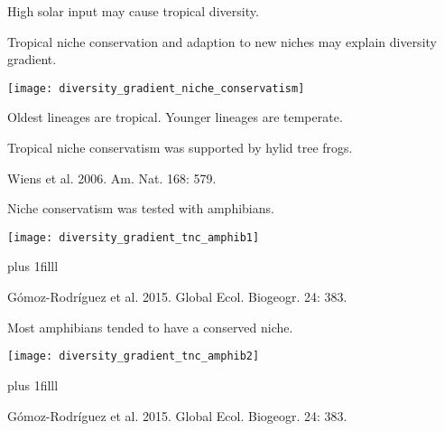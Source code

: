 \documentclass[t]{beamer}
\begin{document}
{
\begin{frame}[b,plain]{High solar input may cause tropical diversity.}

\end{frame}
}



\begin{frame}[t,plain]{Tropical niche conservation and adaption to new niches may explain diversity gradient.}
	\begin{center}
		\texttt{[image: diversity\_gradient\_niche\_conservatism]}
	\end{center}
	
\end{frame}

{
\begin{frame}[t,plain]{Oldest lineages are tropical. Younger lineages are temperate.}

\end{frame}
}

{
\begin{frame}[b,plain]{Tropical niche conservatism was supported by hylid tree frogs.}

\tiny\hfill Wiens et al. 2006. Am. Nat. 168: 579.
\end{frame}
}


\begin{frame}[t,plain]{Niche conservatism was tested with amphibians.}
	\begin{center}
		\texttt{[image: diversity\_gradient\_tnc\_amphib1]}
	\end{center}
	
	\vskip0pt plus 1filll
	
	\tiny Gómoz-Rodríguez et al. 2015. Global Ecol. Biogeogr. 24: 383.
\end{frame}

\begin{frame}[t,plain]{Most amphibians tended to have a conserved niche.}
	\begin{center}
		\texttt{[image: diversity\_gradient\_tnc\_amphib2]}
	\end{center}
	
	\vskip0pt plus 1filll
	
	\tiny Gómoz-Rodríguez et al. 2015. Global Ecol. Biogeogr. 24: 383.
\end{frame}
\end{document}

